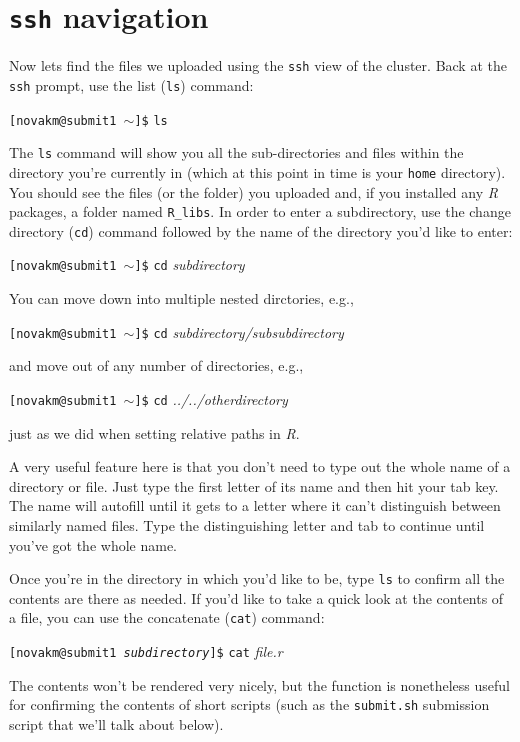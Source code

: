 \documentclass[12pt,letterpaper]{article}
\begin{document}
\section{\texttt{ssh} navigation}
Now lets find the files we uploaded using the \texttt{ssh} view of the cluster.
Back at the \texttt{ssh} prompt, use the list (\texttt{ls}) command:

\texttt{[novakm@submit1 $\sim$]\$} \texttt{ls}

\noindent
The \texttt{ls} command will show you all the sub-directories and files within the directory you're currently in (which at this point in time is your \texttt{home} directory).
You should see the files (or the folder) you uploaded and, if you installed any \emph{R} packages, a folder named \texttt{R\_libs}.
In order to enter a subdirectory, use the change directory (\texttt{cd}) command followed by the name of the directory you'd like to enter:

\texttt{[novakm@submit1 $\sim$]\$} \texttt{cd} \emph{subdirectory}

\noindent
You can move down into multiple nested dirctories, e.g.,

\texttt{[novakm@submit1 $\sim$]\$}  \texttt{cd} \emph{subdirectory/subsubdirectory}

\noindent
and move out of any number of directories, e.g.,

\texttt{[novakm@submit1 $\sim$]\$}  \texttt{cd} \emph{../../otherdirectory}

\noindent
just as we did when setting relative paths in \emph{R}.

A very useful feature here is that you don't need to type out the whole name of a directory or file.
Just type the first letter of its name and then hit your tab key.
The name will autofill until it gets to a letter where it can't distinguish between similarly named files.
Type the distinguishing letter and tab to continue until you've got the whole name.

Once you're in the directory in which you'd like to be, type \texttt{ls} to confirm all the contents are there as needed.
If you'd like to take a quick look at the contents of a file, you can use the concatenate (\texttt{cat}) command:

\texttt{[novakm@submit1 \emph{subdirectory}]\$} \texttt{cat} \emph{file.r}

\noindent
The contents won't be rendered very nicely, but the function is nonetheless useful for confirming the contents of short scripts (such as the \texttt{submit.sh} submission script that we'll talk about below).
\end{document}
